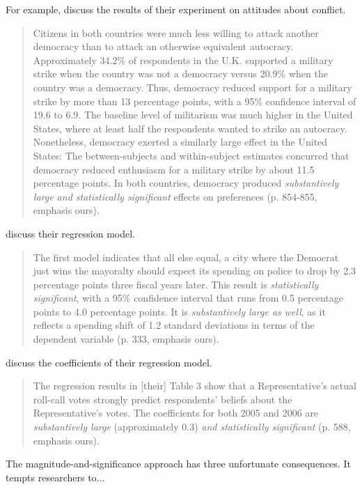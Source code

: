 \documentclass[12pt]{article}
\begin{document}
For example, \cite{TomzWeeks2013} discuss the results of their experiment on attitudes about conflict.

\begin{quote}
Citizens in both countries were much less willing to attack another democracy than to attack an otherwise equivalent autocracy. Approximately 34.2\% of respondents in the U.K. supported a military strike when the country was not a democracy versus 20.9\% when the country was a democracy. Thus, democracy reduced support for a military strike by more than 13 percentage points, with a 95\% confidence interval of 19.6 to 6.9. The baseline level of militarism was much higher in the United States, where at least half the respondents wanted to strike an autocracy. Nonetheless, democracy exerted a similarly large effect in the United States: The between-subjects and within-subject estimates concurred that democracy reduced enthusiasm for a military strike by about 11.5 percentage points. In both countries, democracy produced \emph{substantively large and statistically significant} effects on preferences (p. 854-855, emphasis ours).
\end{quote}

\cite{GerberHopkins2011} discuss their regression model.

\begin{quote}
The first model indicates that all else equal, a city where the Democrat just wins the mayoralty should expect its spending on police to drop by 2.3 percentage points three fiscal years later. This result is \emph{statistically significant}, with a 95\% confidence interval that runs from 0.5 percentage points to 4.0 percentage points. It is \emph{substantively large as well}, as it reflects a spending shift of 1.2 standard deviations in terms of the dependent variable (p. 333, emphasis ours).
\end{quote}

\cite{AnsolabehereJones2010} discuss the coefficients of their regression model.

\begin{quote}
The regression results in [their] Table 3 show that a Representative's actual roll-call votes strongly predict respondents' beliefs about the Representative's votes. The coefficients for both 2005 and 2006 are \emph{substantively large} (approximately 0.3) \emph{and statistically significant} (p. 588, emphasis ours). 
\end{quote}

The magnitude-and-significance approach has three unfortunate consequences. It tempts researchers to...
\end{document}
